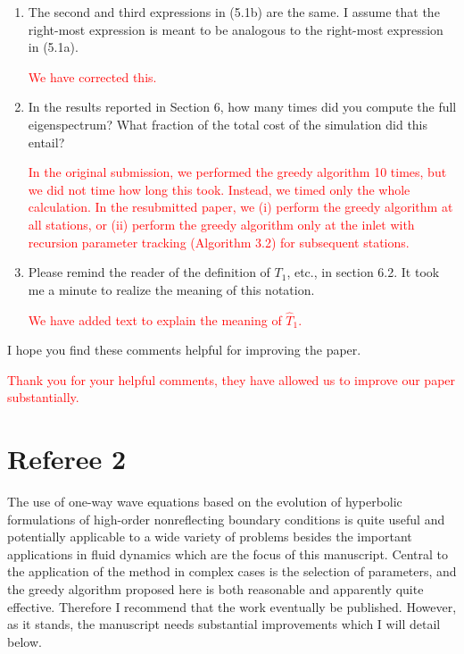 \documentclass{article}
\newcommand{\response}[1]{\textcolor{red}{#1}}
\begin{document}
\begin{enumerate}
    \response{We have removed Appendix B, which plots the error when computing $\beta_*$, as we feel this discussion is no longer necessary now that we use quad to compute $\beta_*$.}
    
    \item The second and third expressions in (5.1b) are the same. I assume that the right-most expression is meant to be analogous to the right-most expression in (5.1a).

    \response{We have corrected this.}
    
    \item In the results reported in Section 6, how many times did you compute the full eigenspectrum? What fraction of the total cost of the simulation did this entail?

    \response{In the original submission, we performed the greedy algorithm 10 times, but we did not time how long this took. Instead, we timed only the whole calculation. In the resubmitted paper, we (i) perform the greedy algorithm at all stations, or (ii) perform the greedy algorithm only at the inlet with recursion parameter tracking (Algorithm 3.2) for subsequent stations.}
    
    \item Please remind the reader of the definition of $T_1$, etc., in section 6.2. It took me a minute to realize the meaning of this notation.

    \response{We have added text to explain the meaning of $\hat{T}_1$.}
\end{enumerate}

I hope you find these comments helpful for improving the paper. 

\response{Thank you for your helpful comments, they have allowed us to improve our paper substantially.}

\pagebreak{}

\section*{Referee 2}

The use of one-way wave equations based on the evolution of hyperbolic formulations of high-order nonreflecting boundary conditions is quite useful and potentially applicable to a wide variety of problems besides the important applications in fluid dynamics which are the focus of this manuscript. Central to the application of the method in complex cases is the selection of parameters, and the greedy algorithm proposed here is both reasonable and apparently quite effective. Therefore I recommend that the work eventually be published. However, as it stands, the manuscript needs substantial improvements which I will detail below.
\end{document}
